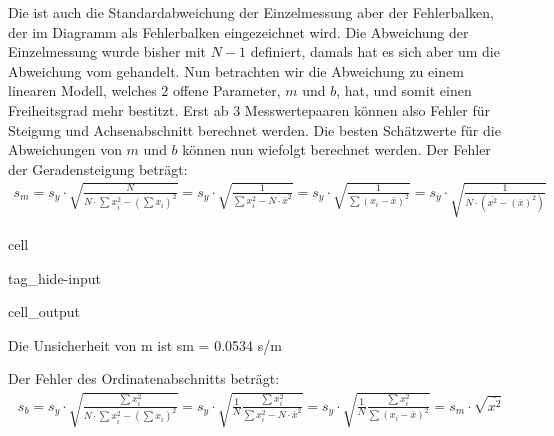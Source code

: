\documentclass[letterpaper,10pt,english]{jupyterBook}
\begin{document}
\sphinxAtStartPar
Die ist auch die Standardabweichung der Einzelmessung aber  der Fehlerbalken, der im Diagramm als Fehlerbalken eingezeichnet wird. Die Abweichung der Einzelmessung wurde bisher mit \(N-1\) definiert, damals hat es sich aber um die Abweichung vom  gehandelt. Nun betrachten wir die Abweichung zu einem linearen Modell, welches 2 offene Parameter, \(m\) und \(b\), hat, und somit einen Freiheitsgrad mehr bestitzt. Erst ab 3 Messwertepaaren können also Fehler für Steigung und Achsenabschnitt berechnet werden.
Die besten Schätzwerte für die Abweichungen von \(m\) und \(b\) können nun wiefolgt berechnet werden. Der Fehler der Geradensteigung beträgt:
\begin{equation*}
\begin{split}s_m = s_y \cdot \sqrt{\frac{N}{N\cdot \sum x_i^2 - \left(\sum x_i\right)^2}} = s_y \cdot \sqrt{\frac{1}{\sum x_i^2 - N\cdot \bar x^2}} = s_y \cdot \sqrt{\frac{1}{\sum \left(x_i - \bar x \right)^2}} = s_y \cdot \sqrt{\frac{1}{N\cdot (\overline{x^2} - (\overline x)^2)}}\end{split}
\end{equation*}
\begin{sphinxuseclass}{cell}
\begin{sphinxuseclass}{tag_hide-input}\begin{sphinxVerbatimOutput}

\begin{sphinxuseclass}{cell_output}
\begin{sphinxVerbatim}[commandchars=\\\{\}]
Die Unsicherheit von m ist 	 s\PYGZus{}m = 0.0534 s/m
\end{sphinxVerbatim}

\end{sphinxuseclass}\end{sphinxVerbatimOutput}

\end{sphinxuseclass}
\end{sphinxuseclass}
\sphinxAtStartPar
Der Fehler des Ordinatenabschnitts beträgt:
\begin{equation*}
\begin{split}s_b = s_y \cdot \sqrt{\frac{\sum x_i^2}{N\cdot \sum x_i^2 - \left(\sum x_i\right)^2}} = s_y \cdot \sqrt{\frac{1}{N}\frac{\sum x_i^2}{\sum x_i^2 - N\cdot \bar x^2}} = s_y \cdot \sqrt{\frac{1}{N}\frac{\sum x_i^2}{\sum \left(x_i - \bar x \right)^2}} = s_m \cdot \sqrt{\overline{x^2}}\end{split}
\end{equation*}
\end{document}

